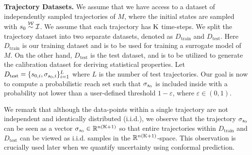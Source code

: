 \textbf{Trajectory Datasets. } We assume that we have access to a dataset of 
independently sampled trajectories of $M$, where the initial states are sampled with 
$s_0 \stackrel{\mathcal{W}}{\sim} \mathcal{I}$. We assume that each trajectory has 
$\mathrm{K}$ time-steps. We split the trajectory dataset into two separate datasets, 
denoted as $D_{\text{train}}$ and $D_{\text{test}}$. 
Here $D_{\text{train}}$ is our training dataset and is to be used for training a surrogate model of $M$. On the other 
hand, $D_{\text{test}}$ is the test dataset, and is to be utilized  to generate the calibration dataset for deriving 
statistical properties. Let $D_{\text{test}}=\{s_{0,i}, \sigma_{s_0,i}\}_{i=1}^L$ where $L$ is the number 
of test trajectories. 
 Our goal is now to compute a probabilistic reach set such that 
 $\sigma_{s_0}$ is included inside with a probability not lower than a user-defined
 threshold $1-\varepsilon$, where $\varepsilon \in (0,1)$.

We remark that although the data-points within a single trajectory are not independent and identically distributed (i.i.d.), we observe that the trajectory $\sigma_{s_0}$ can be seen as a vector $\sigma_{s_0} \in \mathbb{R}^{n(\mathrm{K}+1)}$ so that entire trajectories within $D_{\text{train}}$ and $D_{\text{test}}$ 
can be viewed as i.i.d. samples in the $\mathbb{R}^{n(\mathrm{K}+1)}$-space.
This observation is crucially used later when we quantify uncertainty using conformal prediction. 

